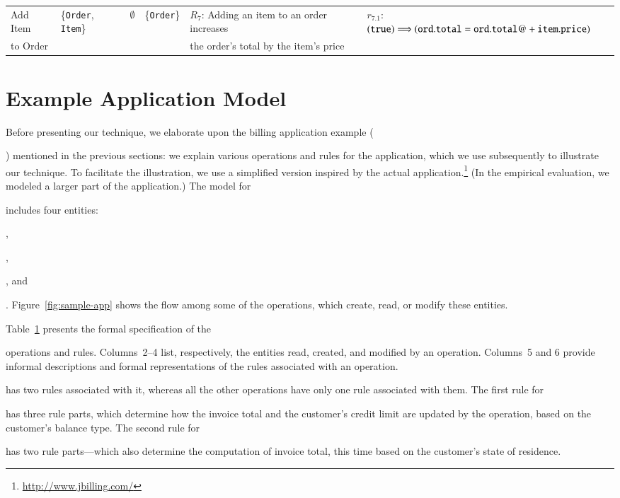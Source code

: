 \begin{table}[t]
{\begin{tabular}{|l|l|l|l|l|l|}
Add Item & \{{\tt Order}, {\tt Item}\} &
\multicolumn{1}{|c|}{$\emptyset$} & \{{\tt Order}\} &
$R_7$: Adding an item to an order increases &
$r_{7.1}$: $({\tt true}) \Longrightarrow ({\tt ord.total} = {\tt ord.total@} +
{\tt item.price})$ \\
to Order & & & & the order's total by the item's price & \\
\hline
\end{tabular}
}
\vspace*{-3ex}
\label{tab:bookstore-rules-spec}
\end{table}

\section{Example Application Model}
\label{sec:example}

Before presenting our technique, we elaborate upon the billing application
example (\subject{jBilling}) mentioned in the previous sections: we explain
various operations and rules for the application, which we use subsequently to
illustrate our technique. To facilitate the illustration, we use a simplified
version inspired by the actual application.\footnote{\scriptsize
  \url{http://www.jbilling.com/}} (In the empirical evaluation, we modeled a
larger part of the application.) The model for \subject{jBilling} includes four
entities: \subject{Customer}, \subject{Item}, \subject{Order}, and
\subject{Invoice}.  Figure~\ref{fig:sample-app} shows the flow among some of the
operations, which create, read, or modify these entities. 

Table~\ref{tab:bookstore-rules-spec} presents the formal specification of the
\subject{jBilling} operations and rules. Columns~2--4 list, respectively, the
entities read, created, and modified by an operation. Columns~5 and 6 provide
informal descriptions and formal representations of the rules associated with an
operation.  \subject{GenerateInvoice} has two rules associated with it, whereas
all the other operations have only one rule associated with them. The first rule
for \subject{GenerateInvoice} has three rule parts, which determine how the
invoice total and the customer's credit limit are updated by the operation,
based on the customer's balance type.  The second rule for
\subject{GenerateInvoice} has two rule parts---which also determine the
computation of invoice total, this time based on the customer's state of
residence.

